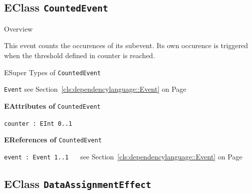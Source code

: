 \subsection{EClass \bfseries \texttt{CountedEvent}\normalfont}
\label{cls:dependencylanguage::CountedEvent} 
	
	\begin{longdescription}
		\item[Overview] 		
				

	

		This event counts the occurences of its subevent. Its own occurence is triggered when the threshold defined in counter is reached.		
		\item[ESuper Types of \texttt{CountedEvent}] ~
			\begin{longdescription}
				\item[\texttt{Event}] see Section~\ref{cls:dependencylanguage::Event} on Page~\pageref{cls:dependencylanguage::Event}						\end{longdescription}
		
	
			\item[\textbf{EAttributes of} \texttt{CountedEvent}] ~
			\begin{longdescription}
	\item[\texttt{counter : EInt \symbol{"5B}0..1\symbol{"5D}
}] ~
	
	
	\nopagebreak
		
				

	

	
			\end{longdescription}
			\item[\textbf{EReferences of} \texttt{CountedEvent}] ~
			\begin{longdescription}
	\item[\texttt{event : Event \symbol{"5B}1..1\symbol{"5D}
}] ~
	see Section~\ref{cls:dependencylanguage::Event} on Page~\pageref{cls:dependencylanguage::Event}
	
	\nopagebreak
		
				

	

	
			\end{longdescription}
	
	\end{longdescription}
	

\subsection{EClass \bfseries \texttt{DataAssignmentEffect}\normalfont}
\label{cls:dependencylanguage::DataAssignmentEffect} 
	

